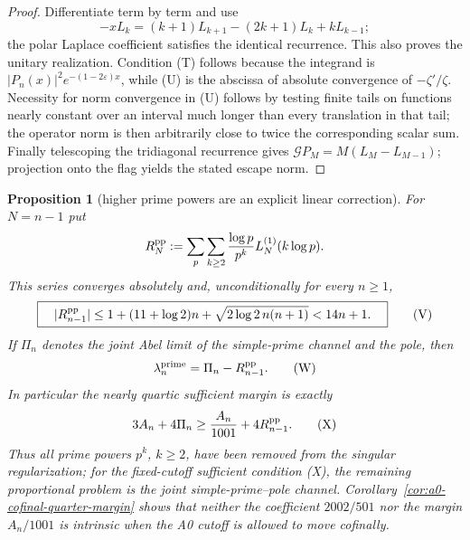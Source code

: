 \documentclass[11pt]{amsart}
\newtheorem{proposition}[theorem]{Proposition}
\theoremstyle{definition}
\theoremstyle{remark}
\theoremstyle{definition}
\begin{document}
\begin{proof}
Differentiate term by term and use
\[
 -xL_k=(k+1)L_{k+1}-(2k+1)L_k+kL_{k-1};
\]
the polar Laplace coefficient satisfies the identical recurrence.  This
also proves the unitary realization.  Condition (T) follows because the
integrand is $|P_n(x)|^2e^{-(1-2\varepsilon)x}$, while (U) is the abscissa
of absolute convergence of $-\zeta'/\zeta$.  Necessity for norm convergence
in (U) follows by testing finite tails on functions nearly constant over an
interval much longer than every translation in that tail; the operator norm
is then arbitrarily close to twice the corresponding scalar sum.  Finally telescoping the
tridiagonal recurrence gives
$\mathcal G P_M=M(L_M-L_{M-1})$; projection onto the flag yields the stated
escape norm.
\end{proof}

\begin{proposition}[higher prime powers are an explicit linear correction]
\label{prop:a1-higher-prime-powers}
For $N=n-1$ put
\[
 R_N^{\rm pp}:=\sum_p\sum_{k\ge2}\frac{\log p}{p^k}
                     L_N^{(1)}(k\log p).
\]
This series converges absolutely and, unconditionally for every $n\ge1$,
\[
 \boxed{\quad
 |R_{n-1}^{\rm pp}|
 \le1+(11+\log2)n+\sqrt{2\log2\,n(n+1)}<14n+1.
 \quad}                                                       \tag{V}
\]
If $\Pi_n$ denotes the joint Abel limit of the simple-prime
channel and the pole, then
\[
 \lambda_n^{\rm prime}=\Pi_n-R_{n-1}^{\rm pp}. \tag{W}
\]
In particular the nearly quartic sufficient margin is exactly
\[
 3A_n+4\Pi_n
 \ge \frac{A_n}{1001}+4R_{n-1}^{\rm pp}.                     \tag{X}
\]
Thus all prime powers $p^k$, $k\ge2$, have been removed from the singular
regularization; for the fixed-cutoff sufficient condition (X),
the remaining proportional problem is the joint simple-prime--pole channel.
Corollary~\ref{cor:a0-cofinal-quarter-margin} shows that neither the
coefficient $2002/501$ nor the margin $A_n/1001$ is intrinsic when the A0
cutoff is allowed to move cofinally.
\end{proposition}
\end{document}
